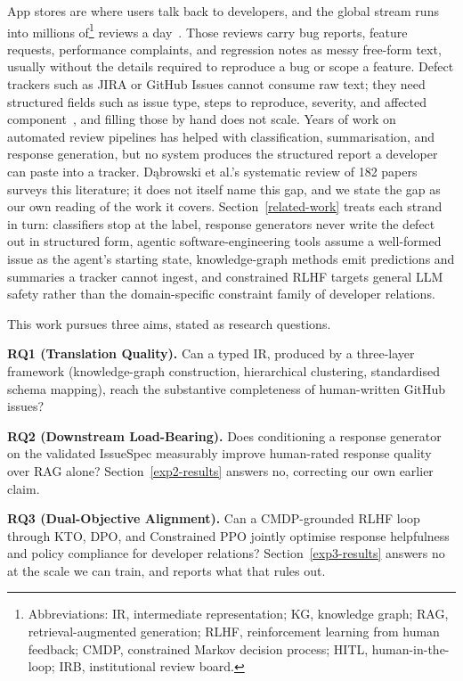 \documentclass[preprint,12pt]{elsarticle}
\begin{document}
App stores are where users talk back to developers, and the global stream runs into millions of\footnote{Abbreviations: IR, intermediate representation; KG, knowledge graph; RAG, retrieval-augmented generation; RLHF, reinforcement learning from human feedback; CMDP, constrained Markov decision process; HITL, human-in-the-loop; IRB, institutional review board.}
reviews a day~\cite{maalej2015bug, gao2019automating, dkabrowski2022analysing}. Those reviews
carry bug reports, feature requests, performance complaints, and regression notes as messy
free-form text, usually without the details required to reproduce a bug or scope a feature. Defect
trackers such as JIRA or GitHub Issues cannot consume raw text; they need structured fields such
as issue type, steps to reproduce, severity, and affected component~\cite{chaparro2017detecting,
zimmermann2010makes}, and filling those by hand does not scale. Years of work on automated review
pipelines has helped with classification, summarisation, and response generation, but no system
produces the structured report a developer can paste into a tracker. D{\k a}browski et al.'s systematic review of 182 papers~\cite{dkabrowski2022analysing}
surveys this literature; it does not itself name this gap, and we state the gap as our own reading
of the work it covers. Section~\ref{related-work} treats each strand in turn: classifiers stop at
the label, response generators never write the defect out in structured form, agentic
software-engineering tools assume a well-formed issue as the agent's starting state,
knowledge-graph methods emit predictions and summaries a tracker cannot ingest, and constrained
RLHF targets general LLM safety rather than the domain-specific constraint family of developer
relations.

This work pursues three aims, stated as research questions.

\textbf{RQ1 (Translation Quality).} Can a typed IR, produced by a three-layer framework
(knowledge-graph construction, hierarchical clustering, standardised schema mapping), reach the
substantive completeness of human-written GitHub issues?

\textbf{RQ2 (Downstream Load-Bearing).} Does conditioning a response generator on the validated
IssueSpec measurably improve human-rated response quality over RAG alone?
Section~\ref{exp2-results} answers no, correcting our own earlier claim.

\textbf{RQ3 (Dual-Objective Alignment).} Can a CMDP-grounded RLHF loop through KTO, DPO, and
Constrained PPO jointly optimise response helpfulness and policy compliance for developer
relations? Section~\ref{exp3-results} answers no at the scale we can train, and reports what that
rules out.
\end{document}
